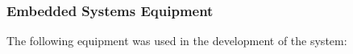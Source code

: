\subsubsection{Embedded Systems Equipment}
The following equipment was used in the development of the system:
\begin{figure}[h]%
    \centering
    \qquad

\end{figure}
